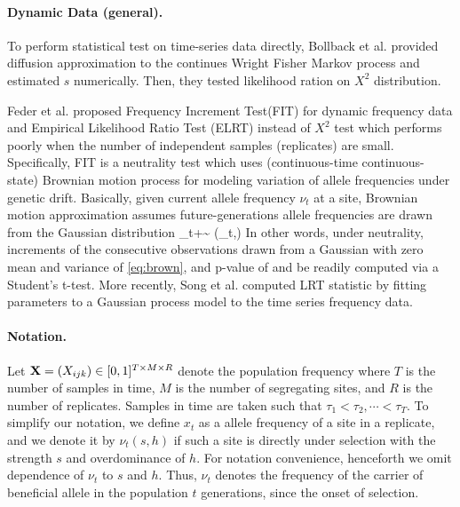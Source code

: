 \documentclass[11pt]{article}
\begin{document}
\paragraph{Dynamic Data (general).} 
To perform statistical test on time-series data directly, Bollback et al. \cite{bollback2008estimation} provided diffusion approximation to the continues Wright Fisher Markov process and estimated $s$ numerically. Then, they tested likelihood ration on $X^2$ distribution.

Feder et al. \cite{feder2014Identifying} proposed Frequency Increment
Test(FIT) for dynamic frequency data and Empirical Likelihood Ratio Test (ELRT) instead of $X^2$ test which performs poorly when the number of independent samples (replicates) are small.
Specifically, FIT is a neutrality test which uses (continuous-time 
continuous-state) Brownian motion process for modeling variation of 
 allele frequencies under genetic drift. 
 Basically, given current allele frequency 
 $\nu_t$ at a site, Brownian motion approximation assumes 
 future-generations allele 
 frequencies are drawn from the Gaussian distribution
 \beq
 \nu_{t+\tau}\sim 
 \Nc\left(\nu_t,\tau\right) 
 \label{eq:brown}
 \eeq
 In other words, under neutrality, increments of the consecutive observations 
 drawn from a Gaussian with 
 zero mean and variance of \eqref{eq:brown}, and p-value of and be readily 
 computed via a Student's t-test. More recently, Song et al. 
 \cite{Terhorst2015Multi} computed LRT statistic by fitting 
 parameters to a Gaussian process model to the time series frequency data. 


\paragraph{Notation.} Let ${\mathbf X} = (X_{ijk}) \in [0, 1]^{T \times 
M\times R}$ denote the population frequency where $T$ is the number of samples 
in time, $M$ is the number of segregating sites, and $R$ is the number of 
replicates. Samples in time are taken such that $\tau_1<\tau_2,\cdots<\tau_T$.
To simplify our notation, we define $x_t$ as a allele frequency of a site in a
 replicate, and we denote it by $\nu_t(s,h)$ if such a site is directly 
 under 
 selection with the strength $s$ and overdominance of $h$. For 
 notation 
 convenience, henceforth we omit dependence of $\nu_t$ to $s$ and 
 $h$. 
 Thus, $\nu_t$ denotes the frequency of 
 the carrier of beneficial allele in the population $t$ generations, since the 
 onset of selection.
\end{document}

